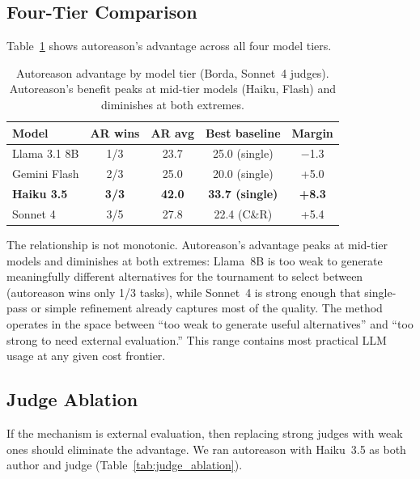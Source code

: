 \documentclass[11pt]{article}
\begin{document}
\subsection{Four-Tier Comparison}

Table~\ref{tab:capability_curve} shows autoreason's advantage across all four model tiers.

\begin{table}[H]
\centering
\small
\begin{tabular}{@{}lcccc@{}}
\toprule
\textbf{Model} & \textbf{AR wins} & \textbf{AR avg} & \textbf{Best baseline} & \textbf{Margin} \\
\midrule
\rowcolor{TableShade}
Llama 3.1 8B & 1/3 & 23.7 & 25.0 (single) & $-$1.3 \\
Gemini Flash & 2/3 & 25.0 & 20.0 (single) & +5.0 \\
\rowcolor{TableShade}
\textbf{Haiku 3.5} & \textbf{3/3} & \textbf{42.0} & \textbf{33.7 (single)} & \textbf{+8.3} \\
Sonnet 4 & 3/5 & 27.8 & 22.4 (C\&R) & +5.4 \\
\bottomrule
\end{tabular}
\caption{Autoreason advantage by model tier (Borda, Sonnet~4 judges). Autoreason's benefit peaks at mid-tier models (Haiku, Flash) and diminishes at both extremes.}
\label{tab:capability_curve}
\end{table}

The relationship is not monotonic. Autoreason's advantage peaks at mid-tier models and diminishes at both extremes: Llama~8B is too weak to generate meaningfully different alternatives for the tournament to select between (autoreason wins only 1/3 tasks), while Sonnet~4 is strong enough that single-pass or simple refinement already captures most of the quality. The method operates in the space between ``too weak to generate useful alternatives'' and ``too strong to need external evaluation.'' This range contains most practical LLM usage at any given cost frontier.

\subsection{Judge Ablation}

If the mechanism is external evaluation, then replacing strong judges with weak ones should eliminate the advantage. We ran autoreason with Haiku~3.5 as both author and judge (Table~\ref{tab:judge_ablation}).
\end{document}
